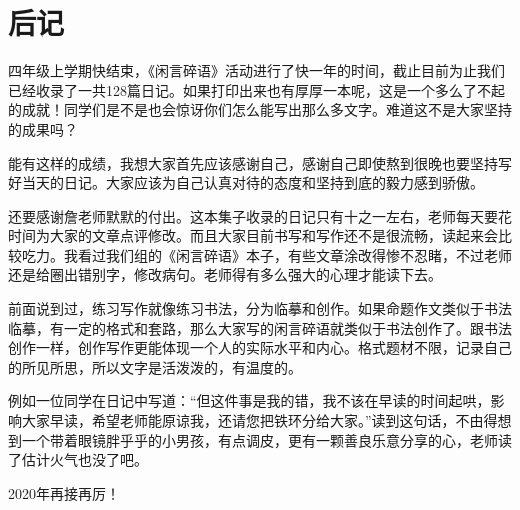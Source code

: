 \section{后记}

四年级上学期快结束，《闲言碎语》活动进行了快一年的时间，截止目前为止我们已经收录了一共128篇日记。如果打印出来也有厚厚一本呢，这是一个多么了不起的成就！同学们是不是也会惊讶你们怎么能写出那么多文字。难道这不是大家坚持的成果吗？

能有这样的成绩，我想大家首先应该感谢自己，感谢自己即使熬到很晚也要坚持写好当天的日记。大家应该为自己认真对待的态度和坚持到底的毅力感到骄傲。

还要感谢詹老师默默的付出。这本集子收录的日记只有十之一左右，老师每天要花时间为大家的文章点评修改。而且大家目前书写和写作还不是很流畅，读起来会比较吃力。我看过我们组的《闲言碎语》本子，有些文章涂改得惨不忍睹，不过老师还是给圈出错别字，修改病句。老师得有多么强大的心理才能读下去。

前面说到过，练习写作就像练习书法，分为临摹和创作。如果命题作文类似于书法临摹，有一定的格式和套路，那么大家写的闲言碎语就类似于书法创作了。跟书法创作一样，创作写作更能体现一个人的实际水平和内心。格式题材不限，记录自己的所见所思，所以文字是活泼泼的，有温度的。

例如一位同学在日记中写道：``但这件事是我的错，我不该在早读的时间起哄，影响大家早读，希望老师能原谅我，还请您把铁环分给大家。''读到这句话，不由得想到一个带着眼镜胖乎乎的小男孩，有点调皮，更有一颗善良乐意分享的心，老师读了估计火气也没了吧。

2020年再接再厉！
